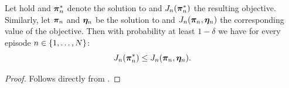 \begin{corollary}
Let  hold 
 and ${\bm{\pi}}_n^{*}$ denote the solution to  and $J_n({\bm{\pi}}_n^*)$ the resulting objective. Similarly, let ${\bm{\pi}}_n$ and ${\bm{\eta}}_n$ be the solution to  and $J_n({\bm{\pi}}_n, {\bm{\eta}}_n)$ the corresponding value of the objective. Then with probability at least $1-\delta$ we have for every episode $n \in \left\{1, \ldots, N\right\}$:
\begin{equation*}
    J_n({\bm{\pi}}_n^*) \le J_n({\bm{\pi}}_n, {\bm{\eta}}_n).
\end{equation*}
\label{cor:optimistic_estimate}
\end{corollary}
\begin{proof}
    Follows directly from .
\end{proof}


